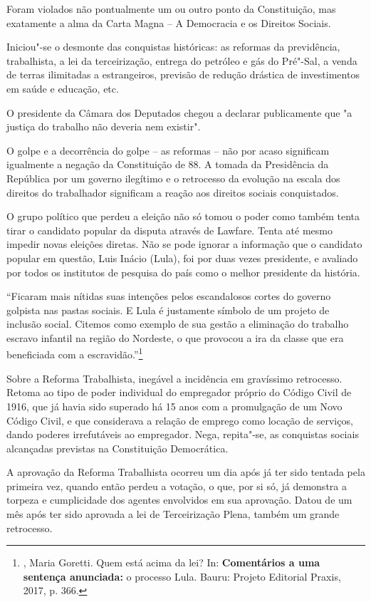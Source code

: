 Foram violados não pontualmente um ou outro ponto da Constituição, mas
exatamente a alma da Carta Magna -- A Democracia e os Direitos Sociais.

Iniciou"-se o desmonte das conquistas históricas: as reformas da
previdência, trabalhista, a lei da terceirização, entrega do petróleo e
gás do Pré"-Sal, a venda de terras ilimitadas a estrangeiros, previsão de
redução drástica de investimentos em saúde e educação, etc.

O presidente da Câmara dos Deputados chegou a declarar publicamente que
"a justiça do trabalho não deveria nem existir".

O golpe e a decorrência do golpe -- as reformas -- não por acaso
significam igualmente a negação da Constituição de 88. A tomada da
Presidência da República por um governo ilegítimo e o retrocesso da
evolução na escala dos direitos do trabalhador significam a reação aos
direitos sociais conquistados.

O grupo político que perdeu a eleição não só tomou o poder como também
tenta tirar o candidato popular da disputa através de Lawfare. Tenta até
mesmo impedir novas eleições diretas. Não se pode ignorar a informação
que o candidato popular em questão, Luis Inácio (Lula), foi por duas
vezes presidente, e avaliado por todos os institutos de pesquisa do país
como o melhor presidente da história.

``Ficaram mais nítidas suas intenções pelos escandalosos cortes do
governo golpista nas pastas sociais. E Lula é justamente símbolo de um
projeto de inclusão social. Citemos como exemplo de sua gestão a
eliminação do trabalho escravo infantil na região do Nordeste, o que
provocou a ira da classe que era beneficiada com a
escravidão.''\footnote{, Maria Goretti. Quem está acima da lei?
  In: \textbf{Comentários a uma sentença anunciada:} o processo Lula.
  Bauru: Projeto Editorial Praxis, 2017, p. 366.}

Sobre a Reforma Trabalhista, inegável a incidência em gravíssimo
retrocesso. Retoma ao tipo de poder individual do empregador próprio do
Código Civil de 1916, que já havia sido superado há 15 anos com a
promulgação de um Novo Código Civil, e que considerava a relação de
emprego como locação de serviços, dando poderes irrefutáveis ao
empregador. Nega, repita"-se, as conquistas sociais alcançadas previstas
na Constituição Democrática.

A aprovação da Reforma Trabalhista ocorreu um dia após já ter sido
tentada pela primeira vez, quando então perdeu a votação, o que, por si
só, já demonstra a torpeza e cumplicidade dos agentes envolvidos em sua
aprovação. Datou de um mês após ter sido aprovada a lei de Terceirização
Plena, também um grande retrocesso.

